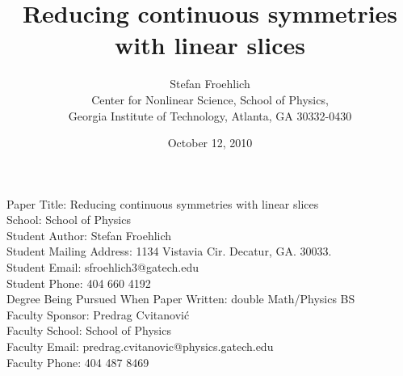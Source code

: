 
\noindent
Paper Title: Reducing continuous symmetries with linear slices
\\School: School of Physics
\\Student Author: Stefan Froehlich
\\Student Mailing Address: 1134 Vistavia Cir. Decatur, GA. 30033.
\\Student Email: sfroehlich3@gatech.edu
\\Student Phone: 404 660 4192
\\Degree Being Pursued When Paper Written: double Math/Physics BS
\\Faculty Sponsor: Predrag Cvitanovi\'{c}
\\Faculty School: School of Physics
\\Faculty Email: predrag.cvitanovic@physics.gatech.edu
\\Faculty Phone: 404 487 8469
\newpage

        \title{Reducing continuous symmetries with linear slices}
        \author{
Stefan Froehlich
\\
Center for Nonlinear Science, School of Physics,
\\
Georgia Institute of Technology,
Atlanta, GA 30332-0430
        }
        \date{October 12, 2010} \Private{\date{\today}}

    \ifarticle
    \else
    \fi %

